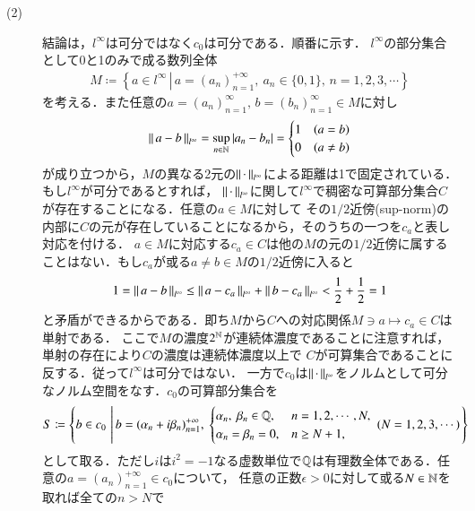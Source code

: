 \begin{prf}
\begin{description}
	\item[(2)]
		結論は，$l^{\infty}$は可分ではなく$c_0$は可分である．順番に示す．
		$l^{\infty}$の部分集合として0と1のみで成る数列全体
		\begin{align}
			M \coloneqq \left\{a \in l^{\infty}\, \left|\, a = (a_n)_{n=1}^{+\infty},\ a_n \in \{0,1\},\, n=1,2,3,\cdots \right.\right\}
		\end{align}
		を考える．また任意の$a=(a_n)_{n=1}^{\infty},\, b=(b_n)_{n=1}^{\infty} \in M$に対し
		\begin{align}
			\left\|\, a-b\, \right\|_{l^{\infty}} = \operatorname*{sup}_{n \in \mathbb{N}} |a_n - b_n| = \begin{cases}
				1 & (a = b) \\
				0 & (a \neq b)
			\end{cases}
		\end{align}
		が成り立つから，$M$の異なる2元の$\left\|\, \cdot\, \right\|_{l^{\infty}}$による距離は1で固定されている．もし$l^{\infty}$が可分であるとすれば，
		$\left\|\, \cdot\, \right\|_{l^{\infty}}$に関して$l^{\infty}$で稠密な可算部分集合$C$が存在することになる．任意の$a \in M$に対して
		その$1/2$近傍(sup-norm)の内部に$C$の元が存在していることになるから，そのうちの一つを$c_a$と表し対応を付ける．
		$a \in M$に対応する$c_a \in C$は他の$M$の元の$1/2$近傍に属することはない．もし$c_a$が或る$a \neq b \in M$の$1/2$近傍に入ると
		\begin{align}
			1 = \left\|\, a-b\, \right\|_{l^{\infty}} \leq \left\|\, a - c_a\, \right\|_{l^{\infty}} + \left\|\, b-c_a\, \right\|_{l^{\infty}} < \frac{1}{2} + \frac{1}{2} = 1
		\end{align}
		と矛盾ができるからである．即ち$M$から$C$への対応関係$M \ni a \longmapsto c_a \in C$は単射である．
		ここで$M$の濃度$2^{\mathbb{N}}$が連続体濃度であることに注意すれば，単射の存在により$C$の濃度は連続体濃度以上で
		$C$が可算集合であることに反する．従って$l^{\infty}$は可分ではない．
		一方で$c_0$は$\left\|\, \cdot\, \right\|_{l^{\infty}}$をノルムとして可分なノルム空間をなす．$c_0$の可算部分集合を
		\begin{align}
			S \coloneqq 
			\left\{b \in c_0\, \left|\, 
			b = (\alpha_n + i \beta_n)_{n=1}^{+\infty},\ 
			\begin{cases}
				\alpha_n,\ \beta_n \in \Q, & n=1,2,\cdots,N,\\
				\alpha_n=\beta_n=0, & n \geq N+1,
			\end{cases}
			\ (N = 1,2,3,\cdots) \right.\right\}
		\end{align}
		として取る．ただし$i$は$i^2 = -1$なる虚数単位で$\mathbb{Q}$は有理数全体である．任意の$a=(a_n)_{n=1}^{+\infty} \in c_0$について，
		任意の正数$\epsilon > 0$に対して或る$N \in \mathbb{N}$を取れば全ての$n > N$で

\end{description}
\end{prf}

